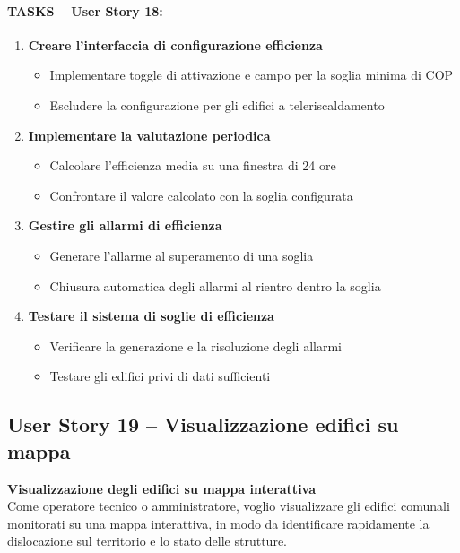 \paragraph*{TASKS – User Story 18:}
\begin{enumerate}
    \item \textbf{Creare l'interfaccia di configurazione efficienza}
    \begin{itemize}
        \item Implementare toggle di attivazione e campo per la soglia minima di COP
        \item Escludere la configurazione per gli edifici a teleriscaldamento
    \end{itemize}
    \item \textbf{Implementare la valutazione periodica}
    \begin{itemize}
        \item Calcolare l'efficienza media su una finestra di 24 ore
        \item Confrontare il valore calcolato con la soglia configurata
    \end{itemize}
    \item \textbf{Gestire gli allarmi di efficienza}
    \begin{itemize}
        \item Generare l'allarme al superamento di una soglia
        \item Chiusura automatica degli allarmi al rientro dentro la soglia
    \end{itemize}
    \item \textbf{Testare il sistema di soglie di efficienza}
    \begin{itemize}
        \item Verificare la generazione e la risoluzione degli allarmi
        \item Testare gli edifici privi di dati sufficienti
    \end{itemize}
\end{enumerate}


\subsection{User Story 19 – Visualizzazione edifici su mappa}
\label{us:mappaEdifici}

\textbf{Visualizzazione degli edifici su mappa interattiva} \\
Come operatore tecnico o amministratore, voglio visualizzare gli edifici comunali monitorati su una mappa interattiva, in modo da identificare rapidamente la dislocazione sul territorio e lo stato delle strutture.


